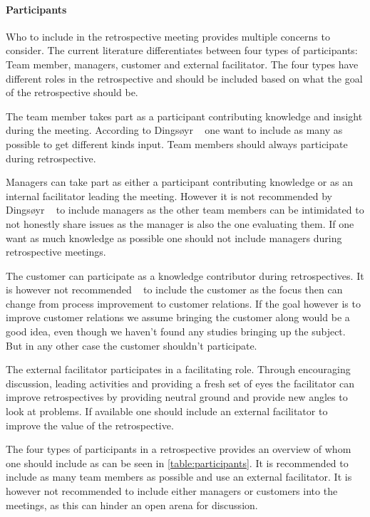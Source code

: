 \documentclass[12pt]{article}
\begin{document}
\paragraph{Participants}
Who to include in the retrospective meeting provides multiple concerns to consider. The current literature differentiates between four types of participants: Team member, managers, customer and external facilitator. The four types have different roles in the retrospective and should be included based on what the goal of the retrospective should be. 

The team member takes part as a participant contributing knowledge and insight during the meeting. According to Dingsøyr ~\cite{Dingsoyr2005} one want to include as many as possible to get different kinds input. Team members should always participate during retrospective.

Managers can take part as either a participant contributing knowledge or as an internal facilitator leading the meeting. However it is not recommended by Dingsøyr ~\cite{Dingsoyr2005} to include managers as the other team members can be intimidated to not honestly share issues as the manager is also the one evaluating them. If one want as much knowledge as possible one should not include managers during retrospective meetings.

The customer can participate as a knowledge contributor during retrospectives. It is however not recommended ~\cite{Dingsoyr2005} to include the customer as the focus then can change from process improvement to customer relations. If the goal however is to improve customer relations we assume bringing the customer along would be a good idea, even though we haven't found any studies bringing up the subject. But in any other case the customer shouldn't participate.

The external facilitator participates in a facilitating role. Through encouraging discussion, leading activities and providing a fresh set of eyes the facilitator can improve retrospectives by providing neutral ground and provide new angles to look at problems. If available one should include an external facilitator to improve the value of the retrospective.

The four types of participants in a retrospective provides an overview of whom one should include as can be seen in \autoref{table:participants}. It is recommended to include as many team members as possible and use an external facilitator. It is however not recommended to include either managers or customers into the meetings, as this can hinder an open arena for discussion. 
\end{document}
